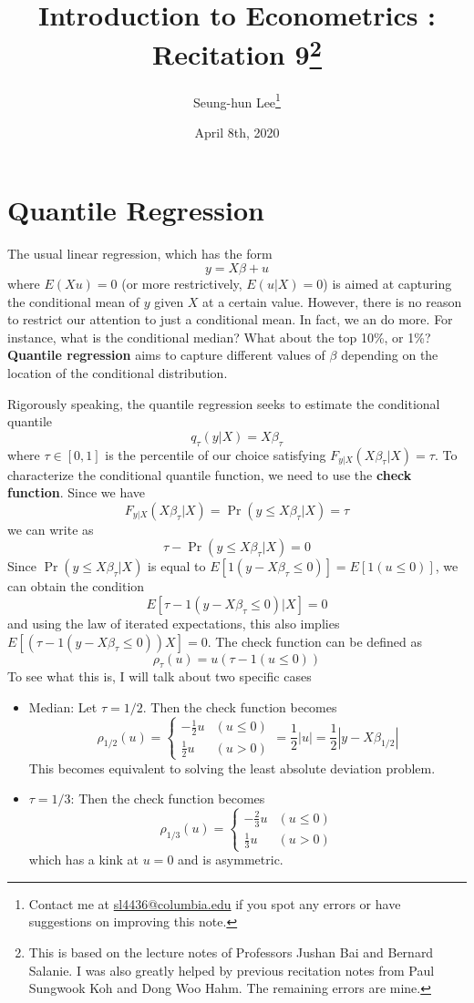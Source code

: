 \documentclass[12pt]{article}
\title{Introduction to Econometrics \ROM{2}: Recitation 9\footnote{This is based on the lecture notes of Professors Jushan Bai and Bernard Salanie. I was also greatly helped by previous recitation notes from Paul Sungwook Koh and Dong Woo Hahm. The remaining errors are mine. }}
\theoremstyle{definition}
\theoremstyle{property}
\theoremstyle{assumption}
\theoremstyle{example}
\theoremstyle{comment}
\begin{document}
\linespread{1.25}
\onehalfspacing

\author{Seung-hun Lee\footnote{Contact me at \href{mailto:sl4436@columbia.edu}{sl4436@columbia.edu} if you spot any errors or have suggestions on improving this note.}}
\date{April 8th, 2020}
\maketitle
\thispagestyle{firstpage}

\section{Quantile Regression}
The usual linear regression, which has the form
\[
y= X\beta+u
\]
where $E(Xu)=0$ (or more restrictively, $E(u|X)=0$) is aimed at capturing the conditional mean of $y$ given $X$ at a certain value. However, there is no reason to restrict our attention to just a conditional mean. In fact, we an do more. For instance, what is the conditional median? What about the top 10\%, or 1\%? \textbf{Quantile regression} aims to capture different values of $\beta$ depending on the location of the conditional distribution. \par 
Rigorously speaking, the quantile regression seeks to estimate the conditional quantile
\[
q_\tau(y | X)=X\beta_\tau
\]
where $\tau\in[0,1]$ is the percentile of our choice satisfying $F_{y|X}(X\beta_\tau|X)=\tau$. To characterize the conditional quantile function, we need to use the \textbf{check function}. Since we have
\[
F_{y|X}(X\beta_\tau|X)=\Pr(y\leq X\beta_\tau|X)=\tau
\]
we can write as
\[
\tau-\Pr(y\leq X\beta_\tau|X)=0
\]
Since $\Pr(y\leq X\beta_\tau|X)$ is equal to $E[1(y- X\beta_\tau\leq 0)]=E[1(u\leq0)]$, we can obtain the condition
\[
E[\tau-1(y- X\beta_\tau\leq 0)|X]=0
\]
and using the law of iterated expectations, this also implies $E[(\tau-1(y- X\beta_\tau\leq 0))X]=0$. The check function can be defined as
\[
\rho_\tau(u)=u(\tau-1(u\leq0))
\]
To see what this is, I will talk about two specific cases
\begin{itemize}
\item Median: Let $\tau=1/2$. Then the check function becomes
\[
\rho_{1/2}(u)=\begin{cases}-\frac{1}{2}u & (u\leq 0) \\ \frac{1}{2}u & (u>0) \end{cases} = \frac{1}{2}|u|=\frac{1}{2}|y-X\beta_{1/2}|
\]
This becomes equivalent to solving the least absolute deviation problem.
\item $\tau=1/3$: Then the check function becomes
\[
\rho_{1/3}(u)=\begin{cases}-\frac{2}{3}u & (u\leq 0) \\ \frac{1}{3}u & (u>0) \end{cases}
\]
which has a kink at $u=0$ and is asymmetric.\par
\end{itemize}\par
\end{document}
